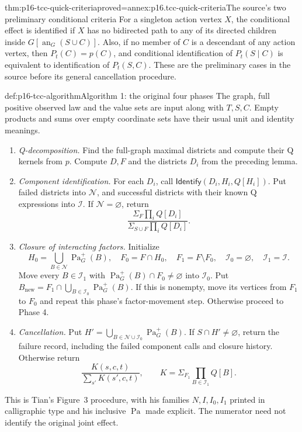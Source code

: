 \begin{hbcorollary}{thm:p16-tcc-quick-criteria}{proved=annex:p16.tcc-quick-criteria}{The source's two preliminary conditional criteria}
For a singleton action vertex \(X\), the conditional effect is
identified if \(X\) has no bidirected path to any of its
directed children inside \(G[\operatorname{an}_G(S\cup C)]\).
Also, if no member of \(C\) is a descendant of any action
vertex, then \(P_t(C)=p(C)\), and conditional identification
of \(P_t(S\mid C)\) is equivalent to identification of
\(P_t(S,C)\). These are the preliminary cases in the source
before its general cancellation procedure.
\end{hbcorollary}

\begin{hbmethod}{def:p16-tcc-algorithm}{Algorithm 1: the original four phases}
The graph, full positive observed law and the value sets are input
along with \(T,S,C\). Empty products and sums over empty coordinate
sets have their usual unit and identity meanings.
\begin{enumerate}
\item \emph{Q-decomposition.} Find the full-graph maximal districts
      and compute their Q kernels from \(p\). Compute \(D,F\)
      and the districts \(D_i\) from the preceding lemma.
\item \emph{Component identification.} For each \(D_i\), call
      \(\mathsf{Identify}(D_i,H_i,Q[H_i])\). Put failed districts
      into \(\mathcal N\), and successful districts with their
      known Q expressions into \(\mathcal I\). If
      \(\mathcal N=\varnothing\), return
      \[
       \frac{\Sigma_F\prod_i Q[D_i]}
            {\Sigma_{S\cup F}\prod_i Q[D_i]}.
      \]
\item \emph{Closure of interacting factors.} Initialize
      \[
       H_0=\bigcup_{B\in\mathcal N}\operatorname{Pa}^{+}_G(B),
       \quad F_0=F\cap H_0,\quad F_1=F\setminus F_0,
       \quad\mathcal I_0=\varnothing,\quad\mathcal I_1=\mathcal I.
      \]
      Move every \(B\in\mathcal I_1\) with
      \(\operatorname{Pa}^{+}_G(B)\cap F_0\ne\varnothing\)
      into \(\mathcal I_0\). Put
      \(B_{\mathrm{new}}=F_1\cap
          \bigcup_{B\in\mathcal I_0}\operatorname{Pa}^{+}_G(B)\).
      If this is nonempty, move its vertices from \(F_1\) to
      \(F_0\) and repeat this phase's factor-movement step.
      Otherwise proceed to Phase 4.
\item \emph{Cancellation.} Put
      \(H'=\bigcup_{B\in\mathcal N\cup\mathcal I_0}
                      \operatorname{Pa}^{+}_G(B)\).
      If \(S\cap H'\ne\varnothing\), return the failure
      record, including the failed component calls and closure history.
      Otherwise return
      \[
       \frac{K(s,c,t)}{\sum_{s'}K(s',c,t)},
       \qquad K=\Sigma_{F_1}\prod_{B\in\mathcal I_1}Q[B].
      \]
\end{enumerate}
This is Tian's Figure~3 procedure, with his families \(N,I,I_0,I_1\)
printed in calligraphic type and his inclusive \(\operatorname{Pa}\)
made explicit. The numerator need not identify the original joint effect.
\end{hbmethod}

